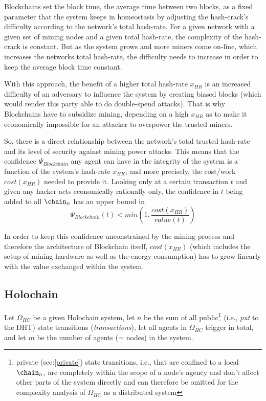 \documentclass[twocolumn,showpacs,%
  nofootinbib,aps,superscriptaddress,%
  eqsecnum,prd,notitlepage,showkeys,10pt]{revtex4-1}
\begin{document}
Blockchains set the block time, the average time between two blocks, as a fixed parameter that the system keeps in homeostasis by adjusting the hash-crack's difficulty according to the network's total hash-rate. For a given network with a given set of mining nodes and a given total hash-rate, the complexity of the hash-crack is constant. But as the system grows and more miners come on-line, which increases the networks total hash-rate, the difficulty needs to increase in order to keep the average block time constant.

With this approach, the benefit of a higher total hash-rate $x_{HR}$ is an increased difficulty of an adversary to influence the system by creating biased blocks (which would render this party able to do double-spend attacks). That is why Blockchains have to subsidize mining, depending on a high $x_{HR}$ as to make it economically impossible for an attacker to overpower the trusted miners.

So, there is a direct relationship between the network's total trusted hash-rate and its level of security against mining power attacks.
This means that the confidence $\Psi_{Blockchain}$ any agent can have in the integrity of the system is a function of the system's hash-rate $x_{HR}$, and more precisely, the cost/work $cost(x_{HR})$ needed to provide it.
Looking only at a certain transaction $t$ and given any hacker acts economically rationally only, the confidence in $t$ being added to all $\chain_n$ has an upper bound in
\begin{equation}
\Psi_{Blockchain}(t) < min\left(1, \frac{cost(x_{HR})}{value(t)}\right)
\end{equation}

In order to keep this confidence unconstrained by the mining process and therefore the architecture of Blockchain itself, $cost(x_{HR})$ (which includes the setup of mining hardware as well as the energy consumption) has to grow linearly with the value exchanged within the system.

\subsection{Holochain}
Let $\Omega_{HC}$ be a given Holochain system, let $n$ be the sum of all public\footnote{private (see:\ref{private}) state transitions, i.e., that are confined to a local $\chain_n$, are completely within the scope of a node's agency and don't affect other parts of the system directly and can therefore be omitted for the complexity analysis of $\Omega_{HC}$ as a distributed system} (i.e., \textit{put} to the DHT) state transitions (\textit{transactions}), let all agents in $\Omega_{HC}$ trigger in total, and let $m$ be the number of agents (= nodes) in the system.
\end{document}
